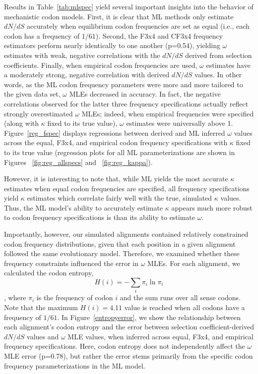 \documentclass[11pt]{article}
\begin{document}
Results in Table~\ref{tab:mlspec} yield several important insights into the behavior of mechanistic codon models. First, it is clear that ML methods only estimate $dN/dS$ accurately when equilibrium codon frequencies are set as equal (i.e., each codon has a frequency of $1/61$). Second, the F3x4 and CF3x4 frequency estimators perform nearly identically to one another (p=0.54), yielding $\omega$ estimates with weak, negative correlations with the $dN/dS$ derived from selection coefficients. Finally, when empirical codon frequencies are used, $\omega$ estimates have a moderately strong, negative correlation with derived $dN/dS$ values. In other words, as the ML codon frequency parameters were more and more tailored to the given data set, $\omega$ MLEs decreased in accuracy. In fact, the negative correlations observed for the latter three frequency specifications actually reflect strongly overestimated $\omega$ MLEs; indeed, when empirical frequencies were specified (along with $\kappa$ fixed to its true value), $\omega$ estimates were universally above 1.  Figure~\ref{reg_fspec} displays regressions between derived and ML inferred $\omega$ values across the equal, F3x4, and empirical codon frequency specifications with $\kappa$ fixed to its true value (regression plots for all ML parameterizations are shown in Figures ~\ref{fig:reg_allspecs} and ~\ref{fig:reg_kappa}).

However, it is interesting to note that, while ML yields the most accurate $\kappa$ estimates when equal codon frequencies are specified, all frequency specifications yield $\kappa$ estimates which correlate fairly well with the true, simulated $\kappa$ values. Thus, the ML model's ability to accurately estimate $\kappa$ appears much more robust to codon frequency specifications is than its ability to estimate $\omega$.

Importantly, however, our simulated alignments contained relatively constrained codon frequency distributions, given that each position in a given alignment followed the same evolutionary model. Therefore, we examined whether these frequency constraints influenced the error in $\omega$ MLEs. For each alignment, we calculated the codon entropy, \begin{equation} H(i) = - \sum_i \pi_i \ln \pi_i \end{equation}, where $\pi_i$ is the frequency of codon $i$ and the sum runs over all sense codons. Note that the maximum $H(i) = 4.11$ value is reached when all codons have a frequency of $1/61$. In Figure~\ref{entropyerror}, we show the relationship between each alignment's codon entropy and the error between selection coefficient-derived $dN/dS$ values and $\omega$ MLE values, when inferred across equal, F3x4, and empirical frequency specifications. Here, codon entropy does not independently affect the $\omega$ MLE error (p=0.78), but rather the error stems primarily from the specific codon frequency parameterizations in the ML model. 
\end{document}
